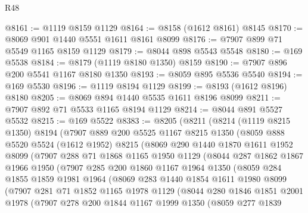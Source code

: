 \begin{lexlean}{R48}
\begin{coremodule}
@8161 := @1119 @8159 @1129
@8164 := @8158 (@1612 @8161) @8145
@8170 := @8069 @901 @1440 @5551 @1611 @8161 @8099
@8176 := @7907 @899 @71 @5549 @1165 @8159 @1129
@8179 := @8044 @898 @5543 @5548
@8180 := @169 @5538
@8184 := @8179 (@1119 @8180 @1350) @8159
@8190 := @7907 @896 @200 @5541 @1167 @8180 @1350
@8193 := @8059 @895 @5536 @5540
@8194 := @169 @5530
@8196 := @1119 @8194 @1129
@8199 := @8193 (@1612 @8196) @8180
@8205 := @8069 @894 @1440 @5535 @1611 @8196 @8099
@8211 := @7907 @892 @71 @5533 @1165 @8194 @1129
@8214 := @8044 @891 @5527 @5532
@8215 := @169 @5522
@8383 := @8205
    (@8211
      (@8214
        (@1119 @8215 @1350)
        @8194
        (@7907
          @889
          @200
          @5525
          @1167
          @8215
          @1350
          (@8059
            @888
            @5520
            @5524
            (@1612 @1952)
            @8215
            (@8069
              @290
              @1440
              @1870
              @1611
              @1952
              @8099
              (@7907
                @288
                @71
                @1868
                @1165
                @1950
                @1129
                (@8044
                  @287
                  @1862
                  @1867
                  @1966
                  @1950
                  (@7907
                    @285
                    @200
                    @1860
                    @1167
                    @1964
                    @1350
                    (@8059
                      @284
                      @1855
                      @1859
                      @1981
                      @1964
                      (@8069
                        @283
                        @1440
                        @1854
                        @1611
                        @1980
                        @8099
                        (@7907
                          @281
                          @71
                          @1852
                          @1165
                          @1978
                          @1129
                          (@8044
                            @280
                            @1846
                            @1851
                            @2001
                            @1978
                            (@7907
                              @278
                              @200
                              @1844
                              @1167
                              @1999
                              @1350
                              (@8059
                                @277
                                @1839

\end{coremodule}
\end{lexlean}
